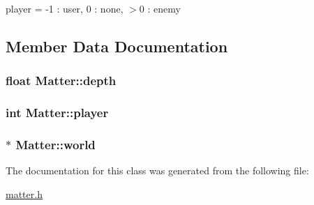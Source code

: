 player = -\/1 \+: user, 0 \+: none, $>$0 \+: enemy 



\subsection{Member Data Documentation}
\hypertarget{classMatter_ae6c374ad27e583eb3a675350914394ae}{}
\subsubsection[{depth}]{\setlength{\rightskip}{0pt plus 5cm}float Matter\+::depth\hspace{0.3cm}{\ttfamily [private]}}\label{classMatter_ae6c374ad27e583eb3a675350914394ae}
\hypertarget{classMatter_a702c712519468f6f68bc945f771c5044}{}
\subsubsection[{player}]{\setlength{\rightskip}{0pt plus 5cm}int Matter\+::player\hspace{0.3cm}{\ttfamily [private]}}\label{classMatter_a702c712519468f6f68bc945f771c5044}
\hypertarget{classMatter_abdc5b13e2427e41c45af024acae015f1}{}
\subsubsection[{world}]{$\ast$ Matter\+::world\hspace{0.3cm}{\ttfamily [protected]}}\label{classMatter_abdc5b13e2427e41c45af024acae015f1}


The documentation for this class was generated from the following file\+:\begin{DoxyCompactItemize}
\item 
\hyperlink{matter_8h}{matter.\+h}\end{DoxyCompactItemize}
